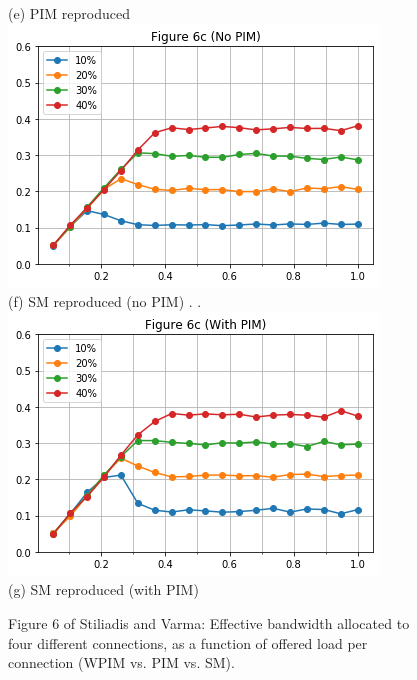 \begin{figure}
        (e) PIM reproduced
    \endminipage\hfill
        \centering
        \includegraphics[width=\linewidth]{figures/stiliadis_fig6c_no_pim.png}\\
        (f) SM reproduced (no PIM)
    \endminipage\hfill
    .
    \endminipage\hfill
    .
    \endminipage\hfill
        \centering
        \includegraphics[width=\linewidth]{figures/stiliadis_fig6c_pim.png}\\
        (g) SM reproduced (with PIM)
    \endminipage
    \caption{Figure 6 of Stiliadis and Varma: Effective bandwidth allocated to four different connections, as a function of offered load per connection (WPIM vs. PIM vs. SM).}
    \label{fig:6-stil}
\end{figure}

